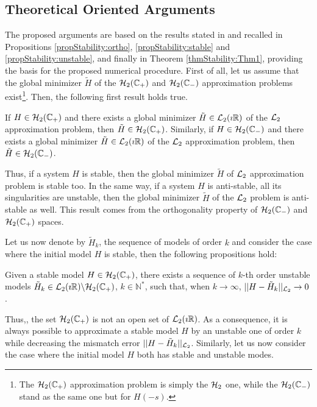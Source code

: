 \documentclass[graybox]{svmult}
\begin{document}
\subsection{Theoretical \mfsa Oriented Arguments}\vspace{-1mm}
The proposed arguments are based on the results stated in \cite{PontesECC:2015} and recalled in Propositions \ref{propStability:ortho}, \ref{propStability:stable} and \ref{propStability:unstable}, and finally in Theorem \ref{thmStability:Thm1}, providing the basis for the proposed numerical procedure. First of all, let us assume that the global minimizer $\tilde H$ of the ${\mathcal{H}_{2}}(\mathbb{C}_+)$ and ${\mathcal{H}_{2}}(\mathbb{C}_-)$ approximation problems exist\footnote{The ${\mathcal{H}_{2}}(\mathbb{C}_+)$ approximation problem is simply the ${\mathcal{H}_{2}}$ one, while the ${\mathcal{H}_{2}}(\mathbb{C}_-)$ stand as the same one but for $H(-s)$.}. Then, the following first result holds true.

\begin{proposition} \label{propStability:ortho}
	If $H\in {\mathcal{H}_{2}}(\mathbb{C}_+)$ and there exists a global minimizer $\tilde H\in {\mathcal{L}_{2}}(\imath\mathbb{R})$ of the ${\mathcal{L}_{2}}$ approximation problem, then $\tilde H\in {\mathcal{H}_{2}}(\mathbb{C}_+)$. 
	Similarly, if $H\in {\mathcal{H}_{2}}(\mathbb{C}_-)$ and there exists a global minimizer $\tilde H\in {\mathcal{L}_{2}}(\imath\mathbb{R})$ of the ${\mathcal{L}_{2}}$ approximation problem, then $\tilde H\in {\mathcal{H}_{2}}(\mathbb{C}_-)$.
\end{proposition}
Thus, if a system $H$ is stable, then the global minimizer $\tilde H$ of ${\mathcal{L}_{2}}$ approximation problem is stable too. In the same way, if a system $H$ is anti-stable, \ie all its singularities are unstable, then the global minimizer $\tilde H$ of the ${\mathcal{L}_{2}}$ problem is anti-stable as well. This result comes from the orthogonality property of ${\mathcal{H}_{2}}(\mathbb{C}_-)$ and ${\mathcal{H}_{2}}(\mathbb{C}_+)$ spaces. 

Let us now denote by $\tilde H_k$, the sequence of models of order $k$ and consider the case where the initial  model $H$ is stable, then the following propositions hold:

\begin{proposition} \label{propStability:stable}
	Given a stable model $H\in  {\mathcal{H}_{2}}(\mathbb{C_+})$, there exists a sequence of $k$-th order unstable models $\tilde H_k\in {\mathcal{L}_{2}}(\imath\mathbb{R})\backslash {\mathcal{H}_{2}}(\mathbb{C}_+)$, $k\in \mathbb{N}^*$, such that, when $k\rightarrow \infty$,
	$|| H-\tilde H_k ||_{{\mathcal{L}_{2}}} \rightarrow 0$.
\end{proposition}
Thus,, the set ${\mathcal{H}_{2}}(\mathbb{C}_+)$ is not an open set of ${\mathcal{L}_{2}}(\imath\mathbb{R})$. As a consequence, it is always possible to approximate a stable model $H$ by an unstable one of order $k$ while decreasing the mismatch error $|| H -\tilde H_k ||_{{\mathcal{L}_{2}}}$. Similarly, let us now consider the case where the initial model $H$ both has stable and unstable modes. 
\end{document}

